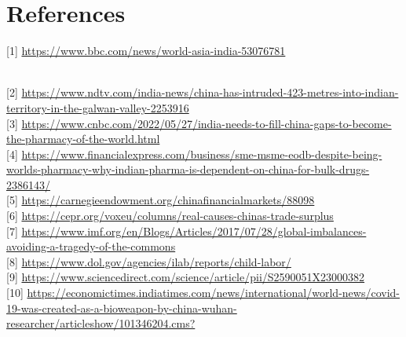 \documentclass{article}
\begin{document}
\newpage

\section*{References}
\hypertarget{link1}{[1] \href{https://www.bbc.com/news/world-asia-india-53076781}{https://www.bbc.com/news/world-asia-india-53076781}}
\\
\hypertarget{link2}{[2] \href{https://www.ndtv.com/india-news/china-has-intruded-423-metres-into-indian-territory-in-the-galwan-valley-2253916}{https://www.ndtv.com/india-news/china-has-intruded-423-metres-into-indian-territory-in-the-galwan-valley-2253916}}
\\
\hypertarget{link3}{[3] \href{https://www.cnbc.com/2022/05/27/india-needs-to-fill-china-gaps-to-become-the-pharmacy-of-the-world.html}{https://www.cnbc.com/2022/05/27/india-needs-to-fill-china-gaps-to-become-the-pharmacy-of-the-world.html}}
\\
\hypertarget{link4}{[4] \href{https://www.financialexpress.com/business/sme-msme-eodb-despite-being-worlds-pharmacy-why-indian-pharma-is-dependent-on-china-for-bulk-drugs-2386143/}{https://www.financialexpress.com/business/sme-msme-eodb-despite-being-worlds-pharmacy-why-indian-pharma-is-dependent-on-china-for-bulk-drugs-2386143/}}
\\
\hypertarget{link5}{[5] \href{https://carnegieendowment.org/chinafinancialmarkets/88098}{https://carnegieendowment.org/chinafinancialmarkets/88098}}
\\
\hypertarget{link6}{[6] \href{https://cepr.org/voxeu/columns/real-causes-chinas-trade-surplus}{https://cepr.org/voxeu/columns/real-causes-chinas-trade-surplus}}
\\
\hypertarget{link7}{[7] \href{https://www.imf.org/en/Blogs/Articles/2017/07/28/global-imbalances-avoiding-a-tragedy-of-the-commons}{https://www.imf.org/en/Blogs/Articles/2017/07/28/global-imbalances-avoiding-a-tragedy-of-the-commons}}
\\
\hypertarget{link8}{[8] \href{https://www.dol.gov/agencies/ilab/reports/child-labor/list-of-goods-print?items_per_page=10&combine=china}{https://www.dol.gov/agencies/ilab/reports/child-labor/}}
\\
\hypertarget{link9}{[9] \href{https://www.sciencedirect.com/science/article/pii/S2590051X23000382}{https://www.sciencedirect.com/science/article/pii/S2590051X23000382}}
\\
\hypertarget{link10}{[10] \href{https://economictimes.indiatimes.com/news/international/world-news/covid-19-was-created-as-a-bioweapon-by-china-wuhan-researcher/articleshow/101346204.cms?}{https://economictimes.indiatimes.com/news/international/world-news/covid-19-was-created-as-a-bioweapon-by-china-wuhan-researcher/articleshow/101346204.cms?}}
\end{document}
